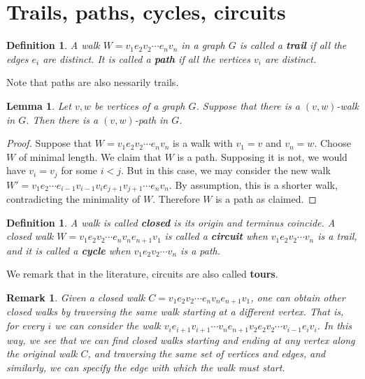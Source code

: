 \documentclass[12pt]{report}
\theoremstyle{plain}
\newtheorem{defn}[thm]{Definition}
\newtheorem{lem}[thm]{Lemma}
\newtheorem{rem}[thm]{Remark}
\newcommand{\Xb}[1]{\textbf{#1}\index{#1}}
\begin{document}
\section{Trails, paths, cycles, circuits}

\begin{defn}
A walk $W = v_1 e_2 v_2 \cdots e_n v_n$ in a graph $G$ is called a
\Xb{trail} if all the edges $e_i$ are distinct. It is called a \Xb{path} if
all the vertices $v_i$ are distinct.
\end{defn}
Note that paths are also nessarily trails.

\begin{lem}
Let $v, w$ be vertices of a graph $G$. Suppose that there is a $(v,w)$-walk
in $G$. Then there is a $(v,w)$-path in $G$.
\end{lem}
\begin{proof}
Suppose that $W = v_1 e_2 v_2 \cdots e_n v_n$ is a walk with $v_1 = v$ and
$v_n = w$. Choose $W$ of minimal length. We claim that $W$ is a path.
Supposing it is not, we would have $v_i = v_j$ for some $i < j$. But in
this case, we may consider the new walk $W' = v_1 e_2 \cdots e_{i-1}
v_{i-1} v_i e_{j+1} v_{j+1} \cdots e_n v_n$. By assumption, this is a
shorter walk, contradicting the minimality of $W$. Therefore $W$ is a path
as claimed.
\end{proof}

\begin{defn}
A walk is called \textbf{closed} is its origin and
terminus coincide. A closed walk $W = v_1 e_2 v_2 \cdots e_n v_n e_{n+1}
v_1$ is called a \Xb{circuit} when $v_1 e_2 v_2 \cdots v_n$ is a trail,
and it is called a \Xb{cycle} when $v_1 e_2 v_2 \cdots v_n$ is a path.
\end{defn}

We remark that in the literature, circuits are also called \Xb{tours}.

\begin{rem} \label{rotate closed walk}
Given a closed walk $C = v_1 e_2 v_2 \cdots e_n v_n e_{n+1} v_1$, one can
obtain other closed walks by traversing the same walk starting at a
different vertex. That is, for every $i$ we can consider the walk $v_i
e_{i+1} v_{i+1} \cdots v_n e_{n+1} v_2 e_2 v_2 \cdots v_{i-1} e_i v_i$. In
this way, we see that we can find closed walks starting and ending at any
vertex along the original walk $C$, and traversing the same set of vertices
and edges, and similarly, we can specify the edge with which the walk must
start.
\end{rem}
\end{document}
